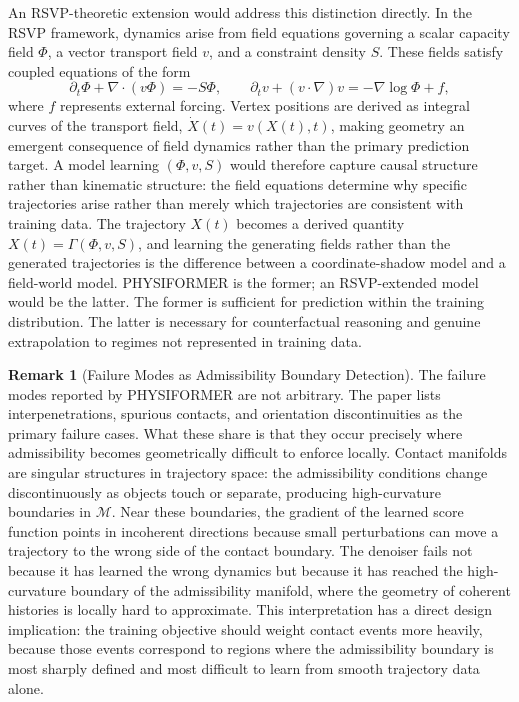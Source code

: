 \documentclass[12pt,oneside]{article}
\theoremstyle{definition}
\newtheorem{remark}[theorem]{Remark}
\newcommand{\Mca}{\mathcal{M}}
\begin{document}
An RSVP-theoretic extension would address this distinction directly. In the
RSVP framework, dynamics arise from field equations governing a scalar capacity
field \(\Phi\), a vector transport field \(v\), and a constraint density \(S\).
These fields satisfy coupled equations of the form
\[
\partial_t \Phi + \nabla \cdot (v\Phi) = -S\Phi, \qquad
\partial_t v + (v \cdot \nabla)v = -\nabla \log \Phi + f,
\]
where \(f\) represents external forcing. Vertex positions are derived as integral
curves of the transport field, \(\dot{X}(t) = v(X(t), t)\), making geometry an
emergent consequence of field dynamics rather than the primary prediction target.
A model learning \((\Phi, v, S)\) would therefore capture causal structure rather
than kinematic structure: the field equations determine why specific trajectories
arise rather than merely which trajectories are consistent with training data.
The trajectory \(X(t)\) becomes a derived quantity \(X(t) = \Gamma(\Phi, v, S)\),
and learning the generating fields rather than the generated trajectories is the
difference between a coordinate-shadow model and a field-world model. PHYSIFORMER
is the former; an RSVP-extended model would be the latter. The former is sufficient
for prediction within the training distribution. The latter is necessary for
counterfactual reasoning and genuine extrapolation to regimes not represented
in training data.

\begin{remark}[Failure Modes as Admissibility Boundary Detection]
The failure modes reported by PHYSIFORMER are not arbitrary. The paper lists
interpenetrations, spurious contacts, and orientation discontinuities as the
primary failure cases. What these share is that they occur precisely where
admissibility becomes geometrically difficult to enforce locally. Contact manifolds
are singular structures in trajectory space: the admissibility conditions change
discontinuously as objects touch or separate, producing high-curvature boundaries
in \(\Mca\). Near these boundaries, the gradient of the learned score function
points in incoherent directions because small perturbations can move a trajectory
to the wrong side of the contact boundary. The denoiser fails not because it
has learned the wrong dynamics but because it has reached the high-curvature
boundary of the admissibility manifold, where the geometry of coherent histories
is locally hard to approximate. This interpretation has a direct design implication:
the training objective should weight contact events more heavily, because those
events correspond to regions where the admissibility boundary is most sharply
defined and most difficult to learn from smooth trajectory data alone.
\end{remark}
\end{document}
